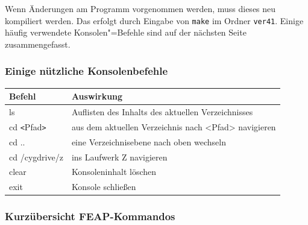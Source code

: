 Wenn \"Anderungen am Programm vorgenommen werden, muss dieses neu kompiliert werden.
Das erfolgt durch Eingabe von \verb|make| im Ordner \verb|ver41|.
Einige h\"aufig verwendete Konsolen"=Befehle sind auf der nächsten Seite zusammengefasst.

\clearpage



\subsubsection*{Einige nützliche Konsolenbefehle}

\begin{minipage}{\textwidth}
\begin{tabular}{ll}
 Befehl                        & Auswirkung \\\toprule
 ls                            & Auflisten des Inhalts des aktuellen Verzeichnisses\\
 cd \verb|<|Pfad\verb|>|       & aus dem aktuellen Verzeichnis nach <Pfad> navigieren\\
 cd ..                         & eine Verzeichnisebene nach oben wechseln\\
 cd /cygdrive/z                & ins Laufwerk Z navigieren\\
 clear                         & Konsoleninhalt l\"oschen\\
 exit                          & Konsole schlie{\ss}en\\\midrule
\end{tabular} 
\end{minipage}\medskip




\subsubsection*{Kurzübersicht FEAP-Kommandos}

